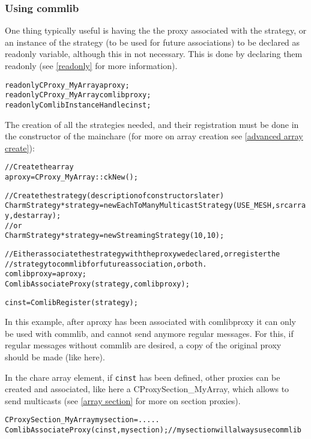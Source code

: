 \subsubsection{Using commlib}

One thing typically useful is having the the proxy associated with the strategy,
or an instance of the strategy (to be used for future associations) to be
declared as readonly variable, although this in not necessary. This is done by
declaring them readonly (see \ref{readonly} for more information).

\begin{alltt}
  readonly CProxy\_MyArray aproxy;
  readonly CProxy\_MyArray comlibproxy;
  readonly ComlibInstanceHandle cinst;
\end{alltt}

The creation of all the strategies needed, and their registration must be done
in the constructor of the mainchare (for more on array creation see
\ref{advanced array create}):

\begin{alltt}
  // Create the array
  aproxy = CProxy\_MyArray::ckNew();

  // Create the strategy (description of constructors later)
  CharmStrategy *strategy = new EachToManyMulticastStrategy(USE_MESH, srcarray, destarray);
  //or
  CharmStrategy *strategy = new StreamingStrategy(10,10);

  // Either associate the strategy with the proxy we declared, or register the
  // strategy to commlib for future association, or both.
  comlibproxy = aproxy;
  ComlibAssociateProxy(strategy, comlibproxy);

  cinst = ComlibRegister(strategy);
\end{alltt}

In this example, after aproxy has been associated with comlibproxy it can only be
used with commlib, and cannot send anymore regular messages. For this, if
regular messages without commlib are desired, a copy of the original proxy
should be made (like here).

In the chare array element, if {\texttt{cinst}} has been defined, other proxies
can be created and associated, like here a CProxySection\_MyArray, which allows
to send multicasts (see \ref{array section} for more on section proxies).

\begin{alltt}
  CProxySection\_MyArray mysection = .....
  ComlibAssociateProxy(cinst, mysection);  // mysection will always use commlib
\end{alltt}

